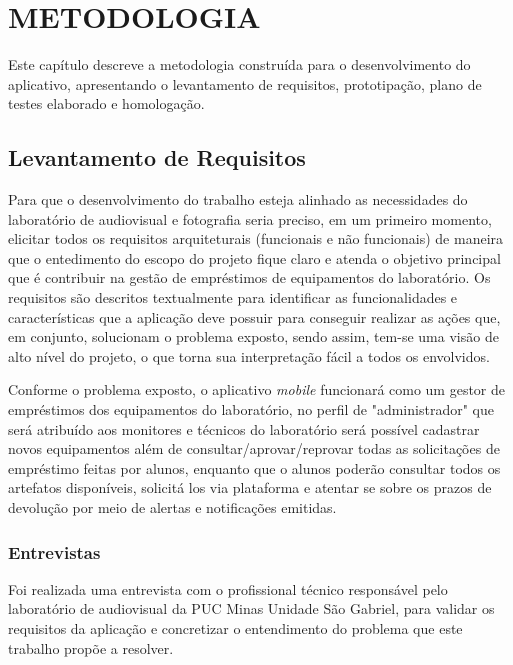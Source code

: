 \chapter{METODOLOGIA}
\label{cap3}

\vspace{-1.9cm}


Este capítulo descreve a metodologia construída para o desenvolvimento do aplicativo, apresentando o levantamento de requisitos, prototipação, plano de testes elaborado e homologação.

    \section{Levantamento de Requisitos}

    Para que o desenvolvimento do trabalho esteja alinhado as necessidades do laboratório de audiovisual e fotografia seria preciso, em um primeiro momento, elicitar todos os requisitos arquiteturais (funcionais e não funcionais) de maneira que o entedimento do escopo do projeto fique claro e atenda o objetivo principal que é contribuir na gestão de empréstimos de equipamentos do laboratório. Os requisitos são descritos textualmente para identificar as funcionalidades e características que a aplicação deve possuir para conseguir realizar as ações que, em conjunto, solucionam o problema exposto, sendo assim, tem-se uma visão de alto nível do projeto, o que torna sua interpretação fácil a todos os envolvidos. 
    
    Conforme o problema exposto, o aplicativo \textit{mobile} funcionará como um gestor de empréstimos dos equipamentos do laboratório, no perfil de "administrador" que será atribuído aos monitores e técnicos do laboratório será possível cadastrar novos equipamentos além de consultar/aprovar/reprovar todas as solicitações de empréstimo feitas por alunos, enquanto que o alunos poderão consultar todos os artefatos disponíveis, solicitá los via plataforma e atentar se sobre os prazos de devolução por meio de alertas e notificações emitidas.
    
    \subsection{Entrevistas}
    
    Foi realizada uma entrevista com o profissional técnico responsável pelo laboratório de audiovisual da PUC Minas Unidade São Gabriel, para validar os requisitos da aplicação e concretizar o entendimento do problema que este trabalho propõe a resolver.
    

